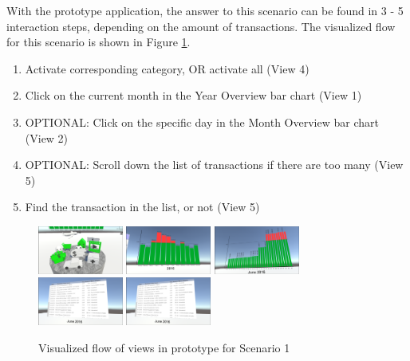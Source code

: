 With the prototype application, the answer to this scenario can be found in 3 - 5 interaction steps, depending on the amount of transactions. The visualized flow for this scenario is shown in Figure \ref{fig:scenariooneprototype}.
\begin{enumerate}
	\item Activate corresponding category, OR activate all (View 4)
	\item Click on the current month in the Year Overview bar chart (View 1)
	\item OPTIONAL: Click on the specific day in the Month Overview bar chart (View 2)
	\item OPTIONAL: Scroll down the list of transactions if there are too many (View 5)
	\item Find the transaction in the list, or not (View 5)
\end{enumerate}
\begin{figure}[h]
	\begin{center}
		\includegraphics[width=2.8cm]{03_Figures/08_Development/View4_CategoriesFiltering.png}
		\includegraphics[width=2.8cm]{03_Figures/08_Development/View1_YearOverview.png}
		\includegraphics[width=2.8cm]{03_Figures/08_Development/View2_MonthOverview.png}
		\includegraphics[width=2.8cm]{03_Figures/08_Development/View5_FinTransactionsOverview.png}
		\includegraphics[width=2.8cm]{03_Figures/08_Development/View5_FinTransactionsOverview.png}
		\caption{Visualized flow of views in prototype for Scenario 1}
		\label{fig:scenariooneprototype}
	\end{center}
\end{figure}


